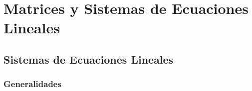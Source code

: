 \documentclass[12pt, fleqn]{report}                             %
\theoremstyle{break}                                            %
\begin{document}
\restoregeometry                                                    %
\nopagecolor                                                        %




\tableofcontents{}
\label{sec:Index}

\clearpage
















 





\part{Matrices y Sistemas de Ecuaciones Lineales}
\clearpage


    \chapter{Sistemas de Ecuaciones Lineales}
        \clearpage


        \section{Generalidades}
\end{document}

